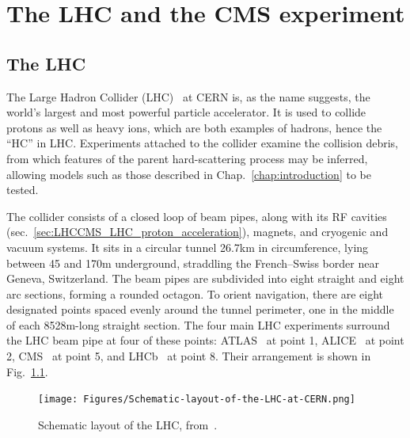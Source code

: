 \chapter{The LHC and the CMS experiment} \label{chap:LHCCMS}
\section{The LHC} \label{sec:LHCCMS_LHC}
The Large Hadron Collider (LHC)~\cite{ref:1748-0221/3/08/S08001} at CERN is, as the name suggests, the world's largest
and most powerful particle accelerator. It is used to collide protons as well as heavy ions, which are both examples of hadrons, hence the ``HC'' in LHC.
Experiments attached to the collider examine the collision debris, from which features of the
parent hard-scattering process may be inferred, allowing models such as those described in Chap.~\ref{chap:introduction} to be tested.

The collider consists of a closed loop of beam pipes, along with its RF cavities (sec.~\ref{sec:LHCCMS_LHC_proton_acceleration}), magnets,
and cryogenic and vacuum systems. It sits in a circular tunnel 26.7\unit{km} in circumference, lying between 45 and 170\unit{m} underground, straddling
the French--Swiss border near Geneva, Switzerland. The beam pipes are subdivided into eight straight and eight arc sections, forming a rounded octagon.
To orient navigation, there are eight designated points spaced evenly around the tunnel perimeter, one in the middle of each 8528\unit{m}-long straight section.
The four main LHC experiments surround the LHC beam pipe at four of these points: ATLAS~\cite{ref:10.1088/1748-0221/3/08/S08003}
at point 1, ALICE~\cite{ref:1748-0221/3/08/S08002} at point 2, CMS~\cite{ref:1748-0221/3/08/S08004} at point 5, and LHCb~\cite{ref:1748-0221/3/08/S08005} at point 8.
Their arrangement is shown in Fig.~\ref{fig:LHC_schematic}.

\begin{figure}[hbtp]
  \begin{center}
    \texttt{[image: Figures/Schematic-layout-of-the-LHC-at-CERN.png]}
    \caption{
    Schematic layout of the LHC, from~\cite{ref:PhysRevAccelBeams.20.091002}.
    }
    \label{fig:LHC_schematic}
  \end{center}
\end{figure}

